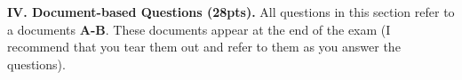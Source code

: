 \documentclass{report}
\newif\ifkey
\newcommand{\answershort}[1]{\ifkey\color{red}\underline{\textbf{#1}}\color{black}\else\underline{\hspace{3in}}\fi\xspace}
\newcommand{\answerlong}[1]{\ifkey\color{red}\textbf{#1}\color{black}\else\vspace{0.5in}\fi\xspace}
\newcommand{\dbqpts}{28}
\newcommand*{\pts}[1]{\addtocounter{points}{#1}(#1pt)}
\begin{document}
\begin{spacing}{1.4}
\begin{enumerate}[leftmargin=*]
    \newpage
    \textbf{IV. Document-based Questions (\dbqpts pts).} All questions in this section refer to a documents \textbf{A-B}.
    These documents appear at the end of the exam (I recommend that you tear them out and refer to them as you answer the questions).
    



      

      

\end{enumerate}
\end{spacing}
\end{document}
